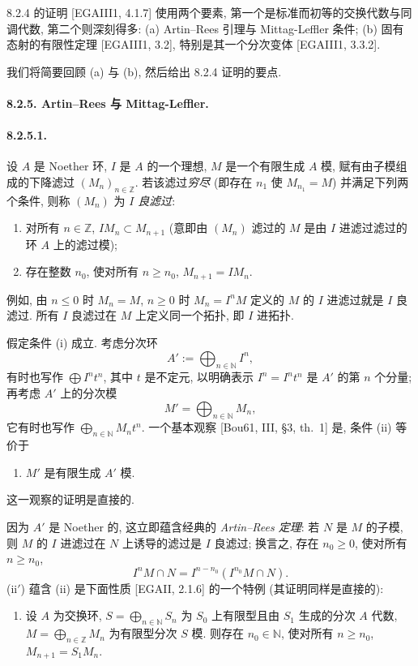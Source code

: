 8.2.4 的证明 [EGAIII1, 4.1.7] 使用两个要素, 第一个是标准而初等的交换代数与同调代数, 第二个则深刻得多: (a) Artin--Rees 引理与 Mittag-Leffler 条件; (b) 固有态射的有限性定理 [EGAIII1, 3.2], 特别是其一个分次变体 [EGAIII1, 3.3.2].

我们将简要回顾 (a) 与 (b), 然后给出 8.2.4 证明的要点.

\paragraph{8.2.5. Artin--Rees 与 Mittag-Leffler.}
\paragraph{8.2.5.1.}
设 $A$ 是 Noether 环, $I$ 是 $A$ 的一个理想, $M$ 是一个有限生成 $A$ 模, 赋有由子模组成的下降滤过 $(M_n)_{n\in\mathbb Z}$. 若该滤过\emph{穷尽} (即存在 $n_1$ 使 $M_{n_1}=M$) 并满足下列两个条件, 则称 $(M_n)$ 为 $I$ \emph{良滤过}:
\begin{enumerate}
\item[(i)] 对所有 $n\in\mathbb Z$, $IM_n\subset M_{n+1}$ (意即由 $(M_n)$ 滤过的 $M$ 是由 $I$ 进滤过滤过的环 $A$ 上的滤过模);
\item[(ii)] 存在整数 $n_0$, 使对所有 $n\geq n_0$, $M_{n+1}=IM_n$.
\end{enumerate}
例如, 由 $n\leq0$ 时 $M_n=M$, $n\geq0$ 时 $M_n=I^nM$ 定义的 $M$ 的 $I$ 进滤过就是 $I$ 良滤过. 所有 $I$ 良滤过在 $M$ 上定义同一个拓扑, 即 $I$ 进拓扑.

假定条件 (i) 成立. 考虑分次环
\[A':=\bigoplus_{n\in\mathbb N}I^n,\]
有时也写作 $\bigoplus I^nt^n$, 其中 $t$ 是不定元, 以明确表示 $I^n=I^nt^n$ 是 $A'$ 的第 $n$ 个分量; 再考虑 $A'$ 上的分次模
\[M'=\bigoplus_{n\in\mathbb N}M_n,\]
它有时也写作 $\bigoplus_{n\in\mathbb N}M_nt^n$. 一个基本观察 [Bou61, III, §3, th.~1] 是, 条件 (ii) 等价于
\begin{enumerate}\item[(ii$'$)] $M'$ 是有限生成 $A'$ 模.\end{enumerate}
这一观察的证明是直接的.

因为 $A'$ 是 Noether 的, 这立即蕴含经典的 \emph{Artin--Rees 定理}: 若 $N$ 是 $M$ 的子模, 则 $M$ 的 $I$ 进滤过在 $N$ 上诱导的滤过是 $I$ 良滤过; 换言之, 存在 $n_0\geq0$, 使对所有 $n\geq n_0$,
\[I^nM\cap N=I^{n-n_0}(I^{n_0}M\cap N).\]
(ii$'$) 蕴含 (ii) 是下面性质 [EGAII, 2.1.6] 的一个特例 (其证明同样是直接的):
\begin{enumerate}\item[(iii)] 设 $A$ 为交换环, $S=\bigoplus_{n\in\mathbb N}S_n$ 为 $S_0$ 上有限型且由 $S_1$ 生成的分次 $A$ 代数, $M=\bigoplus_{n\in\mathbb Z}M_n$ 为有限型分次 $S$ 模. 则存在 $n_0\in\mathbb N$, 使对所有 $n\geq n_0$, $M_{n+1}=S_1M_n$.\end{enumerate}

